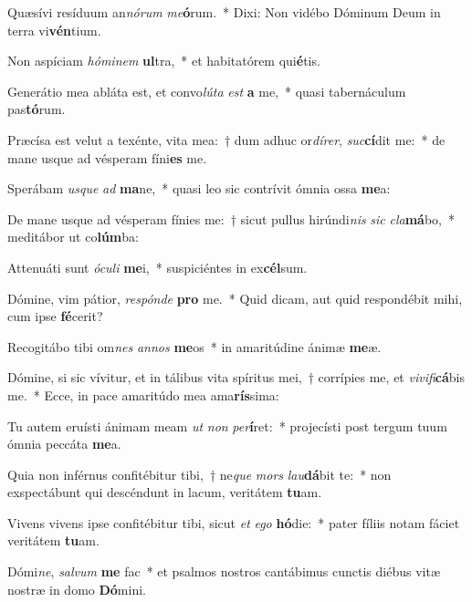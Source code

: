 \item Quæsívi resíduum an\textit{nó}\textit{rum} \textit{me}\textbf{ó}rum.~* Dixi: Non vidébo Dóminum Deum in terra vi\textbf{vén}tium.
\item Non aspíciam \textit{hó}\textit{mi}\textit{nem} \textbf{ul}tra,~* et habitatórem qui\textbf{é}tis.
\item Generátio mea abláta est, et convo\textit{lú}\textit{ta} \textit{est} \textbf{a} me,~* quasi tabernáculum pas\textbf{tó}rum.
\item Præcísa est velut a texénte, vita mea:~† dum adhuc or\textit{dí}\textit{rer}, \textit{suc}\textbf{cí}dit me:~* de mane usque ad vésperam fíni\textbf{es} me.
\item Sperábam \textit{us}\textit{que} \textit{ad} \textbf{ma}ne,~* quasi leo sic contrívit ómnia ossa \textbf{me}a:
\item De mane usque ad vésperam fínies me:~† sicut pullus hirúndi\textit{nis} \textit{sic} \textit{cla}\textbf{má}bo,~* meditábor ut co\textbf{lúm}ba:
\item Attenuáti sunt \textit{ó}\textit{cu}\textit{li} \textbf{me}i,~* suspiciéntes in ex\textbf{cél}sum.
\item Dómine, vim pátior, \textit{re}\textit{spón}\textit{de} \textbf{pro} me.~* Quid dicam, aut quid respondébit mihi, cum ipse \textbf{fé}cerit?
\item Recogitábo tibi om\textit{nes} \textit{an}\textit{nos} \textbf{me}os~* in amaritúdine ánimæ \textbf{me}æ.
\item Dómine, si sic vívitur, et in tálibus vita spíritus mei,~† corrípies me, et \textit{vi}\textit{vi}\textit{fi}\textbf{cá}bis me.~* Ecce, in pace amaritúdo mea ama\textbf{rís}sima:
\item Tu autem eruísti ánimam meam \textit{ut} \textit{non} \textit{per}\textbf{í}ret:~* projecísti post tergum tuum ómnia peccáta \textbf{me}a.
\item Quia non inférnus confitébitur tibi,~† ne\textit{que} \textit{mors} \textit{lau}\textbf{dá}bit te:~* non exspectábunt qui descéndunt in lacum, veritátem \textbf{tu}am.
\item Vivens vivens ipse confitébitur tibi, sicut \textit{et} \textit{e}\textit{go} \textbf{hó}die:~* pater fíliis notam fáciet veritátem \textbf{tu}am.
\item Dómi\textit{ne}, \textit{sal}\textit{vum} \textbf{me} fac~* et psalmos nostros cantábimus cunctis diébus vitæ nostræ in domo \textbf{Dó}mini.
